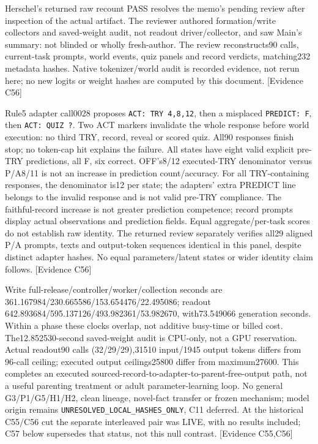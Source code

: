 \documentclass[11pt]{article}
\newcommand{\ev}[1]{\textsf{[Evidence #1]}}
\begin{document}
Herschel's returned raw recount PASS resolves the memo's pending review after
inspection of the actual artifact. The reviewer authored formation/write
collectors and saved-weight audit, not readout driver/collector, and saw Main's
summary: not blinded or wholly fresh-author. The review reconstructs90 calls,
current-task prompts, world events, quiz panels and record verdicts, matching232
metadata hashes. Native tokenizer/world audit is recorded evidence, not rerun
here; no new logits or weight hashes are computed by this document. \ev{C56}

Rule5 adapter call0028 proposes \texttt{ACT: TRY 4,8,12}, then a misplaced
\texttt{PREDICT: F}, then \texttt{ACT: QUIZ ?}. Two ACT markers invalidate the
whole response before world execution: no third TRY, record, reveal or scored
quiz. All90 responses finish stop; no token-cap hit explains the failure.
All states have eight valid explicit pre-TRY predictions, all F, six correct.
OFF's8/12 executed-TRY denominator versus P/A8/11 is not an increase in prediction
count/accuracy. For all TRY-containing responses, the denominator is12 per state;
the adapters' extra PREDICT line belongs to the invalid response and is not valid
pre-TRY compliance. The faithful-record increase is not greater prediction
competence; record prompts display actual observations and prediction fields.
Equal aggregate/per-task scores do not establish raw identity. The returned
review separately verifies all29 aligned P/A prompts, texts and output-token
sequences identical in this panel, despite distinct adapter hashes. No equal
parameters/latent states or wider identity claim follows. \ev{C56}

Write full-release/controller/worker/collection seconds are
361.167984/230.665586/153.654476/22.495086; readout
642.893684/595.137126/493.982361/53.982670, with73.549066 generation seconds.
Within a phase these clocks overlap, not additive busy-time or billed cost.
The12.852530-second saved-weight audit is CPU-only, not a GPU reservation.
Actual readout90 calls (32/29/29),31510 input/1945 output tokens differs from
96-call ceiling; executed output ceilings25800 differ from maximum27600.
This completes an executed sourced-record-to-adapter-to-parent-free-output
path, not a useful parenting treatment or adult parameter-learning loop.
No general G3/P1/G5/H1/H2, clean lineage, novel-fact transfer or frozen mechanism;
model origin remains \texttt{UNRESOLVED\_LOCAL\_HASHES\_ONLY}, C11 deferred.
At the historical C55/C56 cut the separate interleaved pair was LIVE, with no
results included; C57 below supersedes that status, not this null contrast. \ev{C55,C56}
\end{document}
